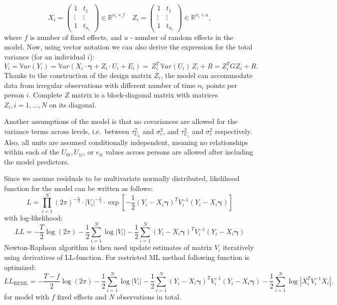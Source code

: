 \documentclass[
  12pt,
]{article}
\begin{document}
\[
X_i = \begin{pmatrix}
                 1 & t_1 \\
                 \vdots & \vdots \\
                 1 & t_{n_i}
              \end{pmatrix} \in \mathbb{R}^{n_i \times f} \quad
Z_i = \begin{pmatrix}
                 1 & t_1 \\
                 \vdots & \vdots \\
                 1 & t_{n_i}
              \end{pmatrix} \in \mathbb{R}^{n_i \times u},
\] where \(f\) is number of fixed effects, and \(u\) - number of random
effects in the model. Now, using vector notation we can also derive the
expression for the total variance (for an individual \(i\)): \[
V_i = \mathbb{V}ar(Y_{i}) = \mathbb{V}ar(X_i \cdot \mathbf{\gamma} + Z_i \cdot U_i + E_i) = \,Z_i^T \, \mathbb{V}ar(U_i)\,Z_i + R =  Z_i^T G Z_i + R.
\] Thanks to the construction of the design matrix \(Z_i\), the model
can accommodate data from irregular observations with different number
of time \(n_i\) points per person \(i\). Complete \(Z\) matrix is a
block-diagonal matrix with matrices \(Z_i, i = 1, \ldots, N\) on its
diagonal.

Another assumptions of the model is that no covariances are allowed for
the variance terms across levels, i.e.~between \(\tau_{U_0}^2\) and
\(\sigma_e^2\), and \(\tau_{U_1}^2\) and \(\sigma_e^2\) respectively.
Also, all units are assumed conditionally independent, meaning no
relationships within each of the \(U_{0i}, U_{1i}\), or \(e_{ti}\)
values across persons are allowed after including the model predictors.

Since we assume residuals to be multivariate normally distributed,
likelihood function for the model can be written as follows: \[
L = \prod_{i=1}^N (2\pi)^{-\frac{n}{2}} \cdot |V_i|^{-\frac{1}{2}} \cdot \exp{\left[{-\frac{1}{2}} (Y_i - X_i \mathbf{\gamma})^T V_i^{-1}(Y_i - X_i \mathbf{\gamma})\right]}  
\] with log-likelihood: \[
LL = -\frac{T}{2} \log(2\pi) -\frac{1}{2}\sum_{i=1}^N\log|V_i| - \frac{1}{2}\sum_{i=1}^N (Y_i - X_i \mathbf{\gamma})^T V_i^{-1}(Y_i - X_i \mathbf{\gamma})
\] Newton-Raphson algorithm is then used update estimates of matrix
\(V_i\) iteratively using derivatives of LL-function. For restricted ML
method following function is optimized: \[
LL_{\mbox{REML}} = -\frac{T-f}{2} \log(2\pi) -\frac{1}{2}\sum_{i=1}^N\log|V_i| - \frac{1}{2}\sum_{i=1}^N (Y_i - X_i \mathbf{\gamma})^T V_i^{-1}(Y_i - X_i \mathbf{\gamma}) - \frac{1}{2}\sum_{i=1}^N\log|X_i^T  V_i^{-1} X_i|,
\] for model with \(f\) fixed effects and \(N\) observations in total.
\end{document}
